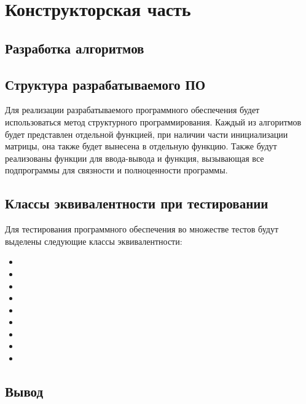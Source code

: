 \chapter{Конструкторская часть}


\section{Разработка алгоритмов}


\section{Структура разрабатываемого ПО}

Для реализации разрабатываемого программного обеспечения будет использоваться
метод структурного программирования. Каждый из алгоритмов будет представлен
отдельной функцией, при наличии части инициализации матрицы, она также будет
вынесена в отдельную функцию. Также будут реализованы функции для ввода-вывода
и функция, вызывающая все подпрограммы для связности и полноценности
программы.

\section{Классы эквивалентности при тестировании}

Для тестирования программного обеспечения во множестве тестов будут выделены
следующие классы эквивалентности:
\begin{itemize}[left=\parindent]
    \item
    \item
    \item
    \item
    \item
    \item
    \item
    \item
    \item
\end{itemize}

\section{Вывод}

